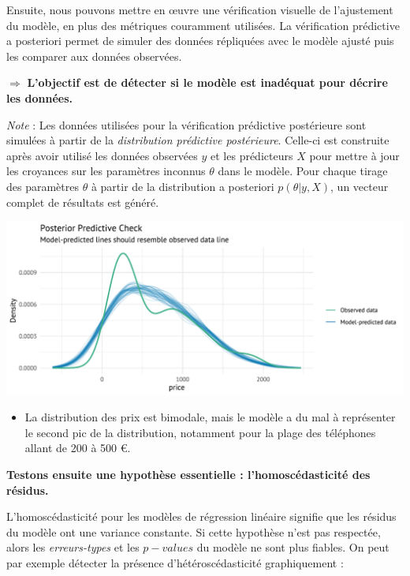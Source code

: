 \documentclass[
  12pt,
]{report}
\providecommand{\tightlist}{%
  \setlength{\itemsep}{0pt}\setlength{\parskip}{0pt}}\usepackage{longtable,booktabs,array}
\begin{document}
Ensuite, nous pouvons mettre en œuvre une vérification visuelle de
l'ajustement du modèle, en plus des métriques couramment utilisées. La
vérification prédictive a posteriori permet de simuler des données
répliquées avec le modèle ajusté puis les comparer aux données
observées.

\(\Rightarrow\) \textbf{L'objectif est de détecter si le modèle est
inadéquat pour décrire les données.}

\emph{Note} : Les données utilisées pour la vérification prédictive
postérieure sont simulées à partir de la \emph{distribution prédictive
postérieure}. Celle-ci est construite après avoir utilisé les données
observées \(y\) et les prédicteurs \(X\) pour mettre à jour les
croyances sur les paramètres inconnus \(\theta\) dans le modèle. Pour
chaque tirage des paramètres \(\theta\) à partir de la distribution a
posteriori \(p(\theta|y,X)\), un vecteur complet de résultats est
généré.

\begin{center}
\includegraphics{report_files/figure-pdf/posterior_level-1.pdf}
\end{center}

\begin{itemize}
\tightlist
\item
  La distribution des prix est bimodale, mais le modèle a du mal à
  représenter le second pic de la distribution, notamment pour la plage
  des téléphones allant de 200 à 500 €.
\end{itemize}

\textbf{Testons ensuite une hypothèse essentielle : l'homoscédasticité
des résidus.}

L'homoscédasticité pour les modèles de régression linéaire signifie que
les résidus du modèle ont une variance constante. Si cette hypothèse
n'est pas respectée, alors les \emph{erreurs-types} et les \(p-values\)
du modèle ne sont plus fiables. On peut par exemple détecter la présence
d'hétéroscédasticité graphiquement :
\end{document}
